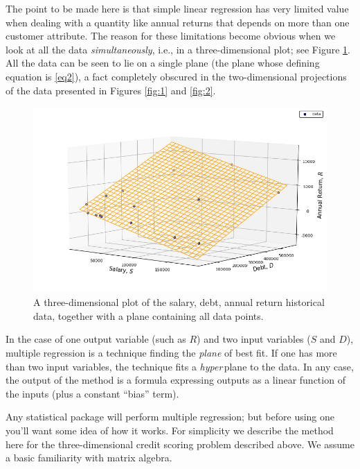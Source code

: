 \documentclass[11pt, reqno]{amsart} \usepackage{hyperlatex}
\begin{document}
The point to be made here is that simple linear regression has very
limited value when dealing with a quantity like annual returns that
depends on more than one customer attribute. The reason for
these limitations become obvious when we look at all the data {\em
  simultaneously}, i.e., in a three-dimensional plot; see Figure
\ref{fig:3}. All the data can be seen to lie on a single plane (the
plane whose defining equation is \eqref{eq2}), a fact completely
obscured in the two-dimensional projections of the data presented in
Figures \ref{fig:1} and \ref{fig:2}.
\begin{figure}
\includegraphics[scale=0.6]{model3.png}
  \caption{A three-dimensional plot of the salary, debt, annual
    return historical data, together with a plane containing all data
    points.}
  \label{fig:3}
\end{figure}

In the case of one output variable (such as $R$) and two input
variables ($S$ and $D$), multiple regression is a technique finding
the {\em plane} of best fit. If one has more than two input variables,
the technique fits a {\em hyper}\,plane to the data. In any case, the
output of the method is a formula expressing outputs as a linear
function of the inputs (plus a constant ``bias'' term).

Any statistical package will perform multiple regression; but before
using one you'll want some idea of how it works. For simplicity we
describe the method here for the three-dimensional credit scoring
problem described above. We assume a basic familiarity with matrix
algebra.
\end{document}

